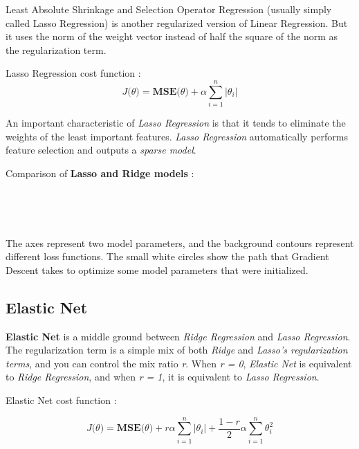 \documentclass[11pt, a4paper]{book}
\begin{document}
Least Absolute Shrinkage and Selection Operator Regression (usually
simply called Lasso Regression) is another regularized version of Linear
Regression. But it uses the norm of the weight vector instead of half
the square of the norm as the regularization term.

Lasso Regression cost function :
\[J \big( \theta \big) = \mathbf{MSE}\big( \theta \big) + \alpha\sum_{i=1}^{n} |\theta_{i}|\]

An important characteristic of \emph{Lasso Regression} is that it tends
to eliminate the weights of the least important features. \emph{Lasso
Regression} automatically performs feature selection and outputs a
\emph{sparse model}.

Comparison of \textbf{Lasso and Ridge models} :

    \begin{center}
    \end{center}
    { \hspace*{\fill} \\}
    
    \begin{center}
    \end{center}
    { \hspace*{\fill} \\}

The axes represent two model parameters, and the background contours
represent different loss functions. The small white circles show the
path that Gradient Descent takes to optimize some model parameters that
were initialized.

    \hypertarget{elastic-net}{%
\subsection{Elastic Net}\label{elastic-net}}

\textbf{Elastic Net} is a middle ground between \emph{Ridge Regression}
and \emph{Lasso Regression}. The regularization term is a simple mix of
both \emph{Ridge} and \emph{Lasso's regularization terms}, and you can
control the mix ratio \emph{r}. When \emph{r = 0}, \emph{Elastic Net} is
equivalent to \emph{Ridge Regression}, and when \emph{r = 1}, it is
equivalent to \emph{Lasso Regression}.

Elastic Net cost function :

\[J \big( \theta \big) = \mathbf{MSE}\big( \theta \big) + r\alpha\sum_{i=1}^{n} |\theta_{i}| + \frac{1-r}{2}\alpha\sum_{i=1}^{n}\theta_{i}^{2}\]
\end{document}
